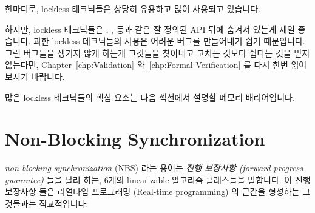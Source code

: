 한마디로, lockless 테크닉들은 상당히 유용하고 많이 사용되고 있습니다.

하지만, lockless 테크닉들은 , ,
 등과 같은 잘 정의된 API 뒤에 숨겨져 있는게 제일 좋습니다.
과한 lockless 테크닉들의 사용은 어려운 버그를 만들어내기 쉽기 때문입니다.
그런 버그들을 생기지 않게 하는게 그것들을 찾아내고 고치는 것보다 쉽다는 것을
믿지 않는다면,
Chapter~\ref{chp:Validation} 와~\ref{chp:Formal Verification} 를 다시 한번
읽어보시기 바랍니다.

많은 lockless 테크닉들의 핵심 요소는 다음 섹션에서 설명할 메모리 배리어입니다.
\iffalse

In short, lockless techniques are quite useful and are heavily used.

However, it is best if lockless techniques are hidden behind a
well-defined API, such as the \co{inc_count()}, \co{memblock_alloc()},
\co{rcu_read_lock()}, and so on.
The reason for this is that undisciplined use of lockless techniques
is a good way to create difficult bugs.
If you don't believe that avoiding such bugs is easier than finding
and fixing them, please re-read
Chapters~\ref{chp:Validation} and~\ref{chp:Formal Verification}.

A key component of many lockless techniques is the memory barrier,
which is described in the following section.
\fi

\section{Non-Blocking Synchronization}
\label{sec:advsync:Non-Blocking Synchronization}

\emph{non-blocking synchronization} (NBS) 라는 용어는
\emph{진행 보장사항 (forward-progress guarantee)} 들을 달리 하는, 6개의
linearizable 알고리즘 클래스들을 말합니다.
이 진행 보장사항 들은 리얼타임 프로그래밍 (Real-time programming) 의 근간을
형성하는 그것들과는 직교적입니다:
\iffalse

The term \emph{non-blocking synchronization} (NBS) describes six classes of
linearizable algorithms with differing \emph{forward-progress guarantees}.
These forward-progress guarantees are orthogonal to those that form the
basis of real-time programming:
\fi

